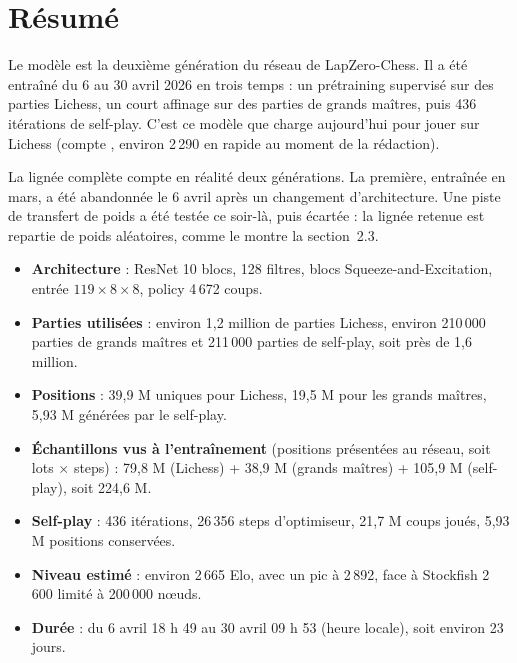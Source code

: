 \section{Résumé}

Le modèle  est la deuxième
génération du réseau de LapZero-Chess. Il a été entraîné du 6 au 30 avril 2026
en trois temps : un prétraining supervisé sur des parties Lichess, un court
affinage sur des parties de grands maîtres, puis 436 itérations de self-play.
C'est ce modèle que  charge aujourd'hui pour jouer sur Lichess
(compte , environ 2\,290 en rapide au moment de la rédaction).

La lignée complète compte en réalité deux générations. La première, entraînée
en mars, a été abandonnée le 6 avril après un changement d'architecture. Une
piste de transfert de poids a été testée ce soir-là, puis écartée : la lignée
retenue est repartie de poids aléatoires, comme le montre la section~2.3.

\begin{chiffres}
\begin{itemize}[leftmargin=1.1em,itemsep=1pt,topsep=2pt]
  \item \textbf{Architecture} : ResNet 10 blocs, 128 filtres, blocs
        Squeeze-and-Excitation, entrée $119 \times 8 \times 8$, policy 4\,672 coups.
  \item \textbf{Parties utilisées} : environ 1,2 million de parties Lichess,
        environ 210\,000 parties de grands maîtres et 211\,000 parties de
        self-play, soit près de 1,6 million.
  \item \textbf{Positions} : 39,9 M uniques pour Lichess, 19,5 M pour les
        grands maîtres, 5,93 M générées par le self-play.
  \item \textbf{Échantillons vus à l'entraînement} (positions présentées au
        réseau, soit lots $\times$ steps) : 79,8 M (Lichess) +
        38,9 M (grands maîtres) + 105,9 M (self-play), soit 224,6 M.
  \item \textbf{Self-play} : 436 itérations, 26\,356 steps d'optimiseur,
        21,7 M coups joués, 5,93 M positions conservées.
  \item \textbf{Niveau estimé} : environ 2\,665 Elo, avec un pic à 2\,892,
        face à Stockfish 2\,600 limité à 200\,000 nœuds.
  \item \textbf{Durée} : du 6 avril 18 h 49 au 30 avril 09 h 53 (heure
        locale), soit environ 23 jours.
\end{itemize}
\end{chiffres}
